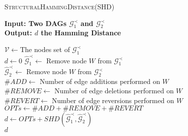 \begin{algorithm}[H]
\caption{\textsc{StructuralHammingDistance(SHD)}}
\label{algor:shd}
\textbf{Input: Two DAGs $\mathcal{G}_1^\prec$ and $\mathcal{G}_2^\prec$} \\
\textbf{Output: $d$ the Hamming Distance}
	\begin{algorithmic}[1]
		\STATE $\mathcal{V} \leftarrow $The nodes set of $\mathcal{G}_1^\prec$\\
			\STATE $d \leftarrow 0$
		\ELSE
			\STATE $\hat{\mathcal{G}}_1^\prec \leftarrow$ Remove node $W$ from $\mathcal{G}_1^\prec$\\
			\STATE $\hat{\mathcal{G}}_2^\prec \leftarrow$ Remove node $W$ from $\mathcal{G}_2^\prec$\\
			\STATE $\#ADD \leftarrow$ Number of edge additions performed on $W$\\
			\STATE $\#REMOVE \leftarrow$ Number of edge deletions performed on $W$\\
			\STATE $\#REVERT \leftarrow$ Number of edge reversions performed on $W$\\
			\STATE $\mathit{OPTs} \leftarrow \#ADD + \#REMOVE + \#REVERT$\\
			\STATE $d \leftarrow \mathit{OPTs} + SHD(\hat{\mathcal{G}}_1^\prec, \hat{\mathcal{G}}_2^\prec)$\\
		\ENDIF
		\RETURN $d$
	\end{algorithmic}
\end{algorithm}
